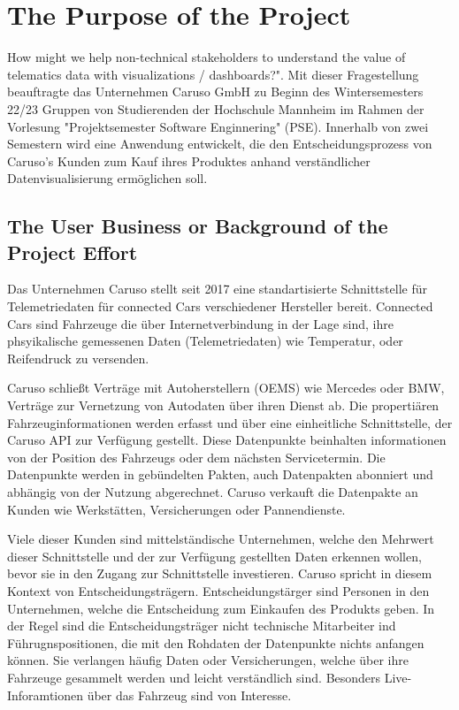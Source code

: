 \chapter{The Purpose of the Project}
How might we help non-technical stakeholders to understand the value of telematics data with visualizations / dashboards?". Mit dieser Fragestellung beauftragte das Unternehmen Caruso GmbH zu Beginn des Wintersemesters 22/23 Gruppen von Studierenden der Hochschule Mannheim im Rahmen der Vorlesung "Projektsemester Software Enginnering" (PSE). Innerhalb von zwei Semestern wird eine Anwendung entwickelt, die den Entscheidungsprozess von Caruso's Kunden zum Kauf ihres Produktes anhand verständlicher Datenvisualisierung ermöglichen soll.

\section{The User Business or Background of the Project Effort}
Das Unternehmen Caruso stellt seit 2017 eine standartisierte Schnittstelle für Telemetriedaten für connected Cars verschiedener Hersteller bereit. Connected Cars sind Fahrzeuge die über Internetverbindung in der Lage sind, ihre phsyikalische gemessenen Daten (Telemetriedaten) wie Temperatur, oder Reifendruck zu versenden.

Caruso schließt Verträge mit Autoherstellern (OEMS) wie Mercedes oder BMW, Verträge zur Vernetzung von Autodaten über ihren Dienst ab. Die propertiären Fahrzeuginformationen werden erfasst und über eine einheitliche Schnittstelle, der Caruso API zur Verfügung gestellt. Diese Datenpunkte beinhalten informationen von der Position des Fahrzeugs oder dem nächsten Servicetermin. Die Datenpunkte werden in gebündelten Pakten, auch Datenpakten abonniert und abhängig von der Nutzung abgerechnet. Caruso verkauft die Datenpakte an Kunden wie Werkstätten, Versicherungen oder Pannendienste.

Viele dieser Kunden sind mittelständische Unternehmen, welche den Mehrwert dieser Schnittstelle und der zur Verfügung gestellten Daten erkennen wollen, bevor sie in den Zugang zur Schnittstelle investieren. Caruso spricht in diesem Kontext von Entscheidungsträgern. Entscheidungstärger sind Personen in den Unternehmen, welche die Entscheidung zum Einkaufen des Produkts geben. In der Regel sind die Entscheidungsträger nicht technische Mitarbeiter ind Führugnspositionen, die mit den Rohdaten der Datenpunkte nichts anfangen können. Sie verlangen häufig Daten oder Versicherungen, welche über ihre Fahrzeuge gesammelt werden und leicht verständlich sind. Besonders Live-Inforamtionen über das Fahrzeug sind von Interesse.

